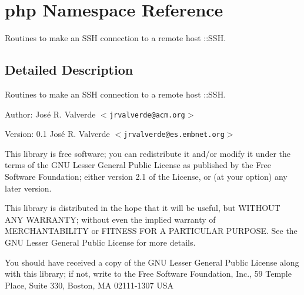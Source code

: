 \section{php Namespace Reference}
\label{namespacephp}
Routines to make an SSH connection to a remote host ::SSH.  




\subsection{Detailed Description}
Routines to make an SSH connection to a remote host ::SSH. 

\begin{Desc}
\item[Author:]Jos\'{e} R. Valverde $<${\tt jrvalverde@acm.org}$>$ \end{Desc}
\begin{Desc}
\item[Version:]0.1  Jos\'{e} R. Valverde $<${\tt jrvalverde@es.embnet.org}$>$\end{Desc}
This library is free software; you can redistribute it and/or modify it under the terms of the GNU Lesser General Public License as published by the Free Software Foundation; either version 2.1 of the License, or (at your option) any later version.

This library is distributed in the hope that it will be useful, but WITHOUT ANY WARRANTY; without even the implied warranty of MERCHANTABILITY or FITNESS FOR A PARTICULAR PURPOSE. See the GNU Lesser General Public License for more details.

You should have received a copy of the GNU Lesser General Public License along with this library; if not, write to the Free Software Foundation, Inc., 59 Temple Place, Suite 330, Boston, MA 02111-1307 USA 

